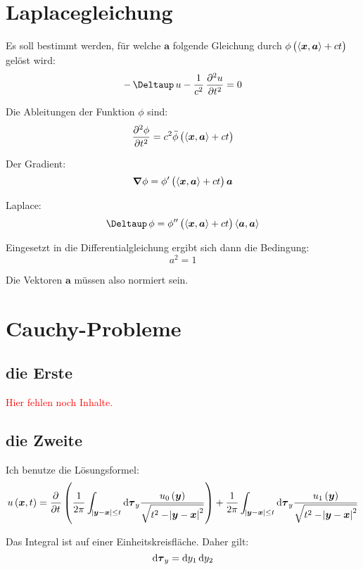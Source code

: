 \documentclass[11pt, ngerman, fleqn]{article}
\newcommand{\fehlt}{\textcolor{red}{Hier fehlen noch Inhalte.}}
\newcommand{\inner}[2]{\left\langle #1, #2 \right\rangle}
\newcommand{\laplace}{\mathop{{}\Deltaup}\nolimits}
\newcommand{\vnabla}{\vec \nabla}
\renewcommand{\vec}[1]{\boldsymbol{#1}}
\begin{document}
\section{Laplacegleichung}
\label{2}

Es soll bestimmt werden, für welche $\vec a$ folgende Gleichung durch $\phi\del{\inner{\vec x}{\vec a} + ct}$ gelöst wird:
\[
	- \laplace u - \frac1{c^2} \dpd[2] ut = 0
\]

Die Ableitungen der Funktion $\phi$ sind:
\[
	\dpd[2]\phi t = c^2 \ddot \phi\del{\inner{\vec x}{\vec a} + ct}
\]

Der Gradient:
\[
	\vnabla \phi = \phi'\del{\inner{\vec x}{\vec a} + ct} \vec a
\]

Laplace:
\[
	\laplace \phi = \phi''\del{\inner{\vec x}{\vec a} + ct} \inner{\vec a}{\vec a}
\]

Eingesetzt in die Differentialgleichung ergibt sich dann die Bedingung:
\[
	a^2 = 1
\]

Die Vektoren $\vec a$ müssen also normiert sein.


\section{Cauchy-Probleme}
\label{3}

\subsection{die Erste}

\fehlt

\subsection{die Zweite}

Ich benutze die Lösungsformel:
\[
	u\del{\vec x, t} = \dpd{}t \del{
		\frac{1}{2 \pi} \int_{\abs{\vec y - \vec x} \leq t} \dif \vec \tau_y \frac{u_0\del{\vec y}}{\sqrt{t^2 - \abs{\vec y - \vec x}^2}}
	}
	+
	\frac{1}{2 \pi} \int_{\abs{\vec y - \vec x} \leq t} \dif \vec \tau_y \frac{u_1\del{\vec y}}{\sqrt{t^2 - \abs{\vec y - \vec x}^2}}
\]

Das Integral ist auf einer Einheitskreisfläche. Daher gilt:
\[
	\dif \vec \tau_y = \dif y_1 \dif y_2
\]
\end{document}
